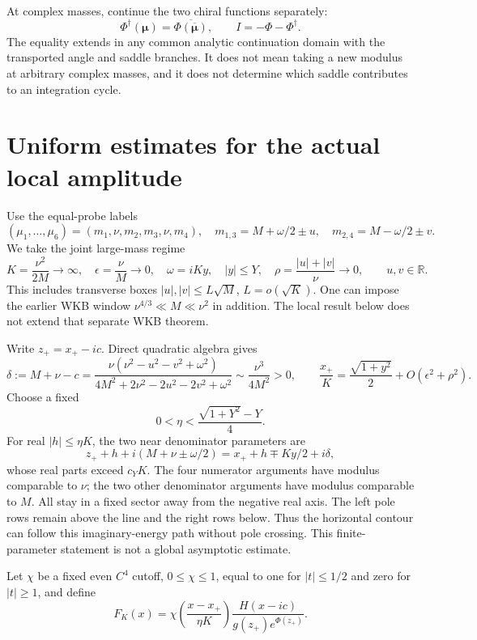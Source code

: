 \documentclass[11pt,a4paper]{article}
\begin{document}
At complex masses, continue the two chiral functions separately:
\[
 \Phi^\dagger(\boldsymbol\mu)
 =\overline{\Phi(\overline{\boldsymbol\mu})},\qquad
 I=-\Phi-\Phi^\dagger .
\]
The equality extends in any common analytic continuation domain
with the transported angle and saddle branches. It does not mean
taking a new modulus at arbitrary complex masses, and it does not
determine which saddle contributes to an integration cycle.

\section{Uniform estimates for the actual local amplitude}
Use the equal-probe labels
\[
 (\mu_1,\ldots,\mu_6)=(m_1,\nu,m_2,m_3,\nu,m_4),\quad
 m_{1,3}=M+\omega/2\pm u,\quad m_{2,4}=M-\omega/2\pm v.
\]
We take the joint large-mass regime
\begin{equation}
 K=\frac{\nu^2}{2M}\to\infty,\quad \epsilon=\frac{\nu}{M}\to0,\quad
 \omega=iKy,\quad |y|\le Y,\quad
 \rho=\frac{|u|+|v|}{\nu}\to0,\qquad u,v\in\mathbb R.
 \label{eq:regime}
\end{equation}
This includes transverse boxes
\(|u|,|v|\le L\sqrt M\), \(L=o(\sqrt K)\).
One can impose the earlier WKB window
\(\nu^{4/3}\ll M\ll\nu^2\) in addition.
The local result below does not extend that separate WKB theorem.

Write \(z_+=x_+-ic\). Direct quadratic algebra gives
\begin{equation}
 \delta:=M+\nu-c=
 \frac{\nu(\nu^2-u^2-v^2+\omega^2)}
 {4M^2+2\nu^2-2u^2-2v^2+\omega^2}
 \sim\frac{\nu^3}{4M^2}>0,\qquad
 \frac{x_+}{K}=\frac{\sqrt{1+y^2}}2+O(\epsilon^2+\rho^2).
 \label{eq:gap}
\end{equation}
Choose a fixed
\[
 0<\eta<\frac{\sqrt{1+Y^2}-Y}{4}.
\]
For real \(|h|\le\eta K\), the two near denominator parameters are
\[
 z_++h+i(M+\nu\pm\omega/2)
 =x_++h\mp Ky/2+i\delta,
\]
whose real parts exceed \(c_YK\).
The four numerator arguments have modulus comparable to \(\nu\);
the two other denominator arguments have modulus comparable to \(M\).
All stay in a fixed sector away from the negative real axis.
The left pole rows remain above the line and the right rows below.
Thus the horizontal contour can follow this imaginary-energy path
without pole crossing. This finite-parameter statement is not a
global asymptotic estimate.

Let \(\chi\) be a fixed even \(C^4\) cutoff, \(0\le\chi\le1\),
equal to one for \(|t|\le1/2\) and zero for \(|t|\ge1\), and define
\begin{equation}
 F_K(x)=\chi\left(\frac{x-x_+}{\eta K}\right)
 \frac{H(x-ic)}{g(z_+)e^{\Phi(z_+)}} .
 \label{eq:F}
\end{equation}
\end{document}
